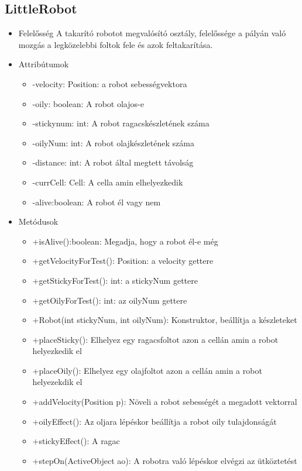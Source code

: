 \begin{itemize}
\subsection{LittleRobot}
\begin{itemize}
	\item Felelősség\newline
	A takarító robotot megvalósító osztály, felelőssége a pályán való mozgás a legközelebbi foltok fele és azok feltakarítása.
	\item Attribútumok\newline
	\begin{itemize}
		\item -velocity: Position: a robot sebességvektora
		\item -oily: boolean: A robot olajos-e
		\item -stickynum: int: A robot ragacskészletének száma
		\item -oilyNum: int: A robot olajkészletének száma
		\item -distance: int: A robot által megtett távolság
		\item -currCell: Cell: A cella amin elhelyezkedik
		\item -alive:boolean: A robot él vagy nem
	\end{itemize}
	\item Metódusok\newline
	\begin{itemize}
		\item +isAlive():boolean: Megadja, hogy a robot él-e még
		\item +getVelocityForTest(): Position: a velocity gettere
		\item +getStickyForTest(): int: a stickyNum gettere
		\item +getOilyForTest(): int: az oilyNum gettere
		\item +Robot(int stickyNum, int oilyNum): Konstruktor, beállítja a készleteket
		\item +placeSticky(): Elhelyez egy ragacsfoltot azon a cellán amin a robot helyezkedik el
		\item +placeOily(): Elhelyez egy olajfoltot azon a cellán amin a robot helyezekdik el
		\item +addVelocity(Position p): Növeli a robot sebességét a megadott vektorral
		\item +oilyEffect(): Az oljara lépéskor beállítja a robot oily tulajdonságát
		\item +stickyEffect(): A ragac
		\item +stepOn(ActiveObject ao): A robotra való lépéskor elvégzi az ütköztetést

\end{itemize}
\end{itemize}
\end{itemize}

